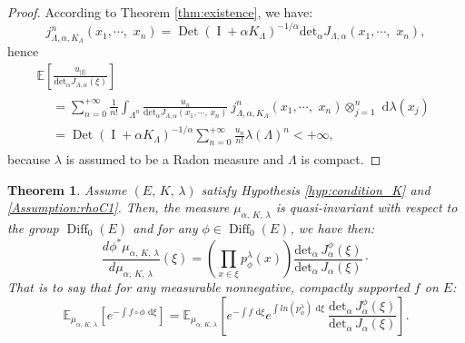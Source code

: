 \documentclass[11pt,a4paper]{amsart}
\newtheorem{Theorem}{Theorem}
\begin{document}
\begin{proof}
  According to Theorem \ref{thm:existence}, we have:
  \begin{equation*}
    j^n_{\Lambda,\alpha,K_{\Lambda}}(x_1,\cdots,\,\, x_n)={\operatorname{Det}} ({\operatorname{I}} +\alpha K_{\Lambda})^{-1/\alpha} {{\text{det}}}_{\alpha}  J_{\Lambda,\alpha}(x_1,\cdots,\,\, x_n),
  \end{equation*}
  hence
  \begin{multline*}
    \mathbb{E}\left[\frac{u_{|\xi|}}{{{\text{det}}}_{\alpha}
        J_{\Lambda,\alpha}(\xi)}\right]\\
    \begin{aligned}
      &=\sum_{n=0}^{+\infty}\frac{1}{n!}\int_{\Lambda^n}\frac{u_n}{{{\text{det}}}_{\alpha}
        J_{\Lambda,\alpha}(x_1,\cdots,\, x_n)}\ j^n_{\Lambda,\alpha,K_{\Lambda}}(x_1,\cdots,\,\, x_n)\otimes_{j=1}^n{\text{ d}}\lambda(x_j)\\
      
      
      
      
      
      &={\operatorname{Det}} ({\operatorname{I}} +\alpha K_{\Lambda})^{-1/\alpha}
      \sum_{n=0}^{+\infty}\frac{u_n}{n!} \lambda(\Lambda)^n<+\infty,
    \end{aligned}
  \end{multline*}
  because $\lambda$ is assumed to be a Radon measure and $\Lambda$ is
  compact.
\end{proof}
\begin{Theorem}
  \label{thm:image_homeo}
  Assume $(E,\, K,\, \lambda)$ satisfy Hypothesis
  \ref{hyp:condition_K} and \ref{Assumption:rhoC1}.  Then, the measure
  $\mu_{\alpha,\, K,\, \lambda}$ is quasi-invariant with respect to
  the group ${\operatorname{Diff}} _0(E)$ and for any $\phi \in {\operatorname{Diff}} _0(E)$, we have
  then:
  \begin{equation*}
    \frac{ d\phi^*\mu_{\alpha,\,K,\,\lambda} }{
      d\mu_{\alpha,\,K,\,\lambda} }
    (\xi)=\left(\prod_{x\in\xi}p^{\lambda}_{\phi}(x)\right)
    \frac{{{\text{det}}}_{\alpha} \, J_{\alpha}^{\phi}(\xi)}{{{\text{det}}}_{\alpha}\, 
      J_{\alpha}(\xi)}\cdotp
  \end{equation*} 
  That is to say that for any measurable nonnegative, compactly
  supported $f$ on $E$:
  \begin{equation}\label{formule1}
    {{\mathbb E}}_{\mu_{\alpha,\, K,\, \lambda}}\left[e^{-\int f \circ \phi {\text{ d}}\xi}\right]=
    {{\mathbb E}}_{\mu_{\alpha,\, K,\, \lambda}}\left[e^{-\int f {\text{ d}}\xi }e^{\int
        ln(p^{\lambda}_{\phi}){\text{ d}}\xi}\ \frac{{{\text{det}}}_{\alpha}\,
        J_{\alpha}^{\phi}(\xi)}{{{\text{det}}}_{\alpha}\, 
        J_{\alpha}(\xi)}\right].
  \end{equation}
\end{Theorem}
\end{document}
